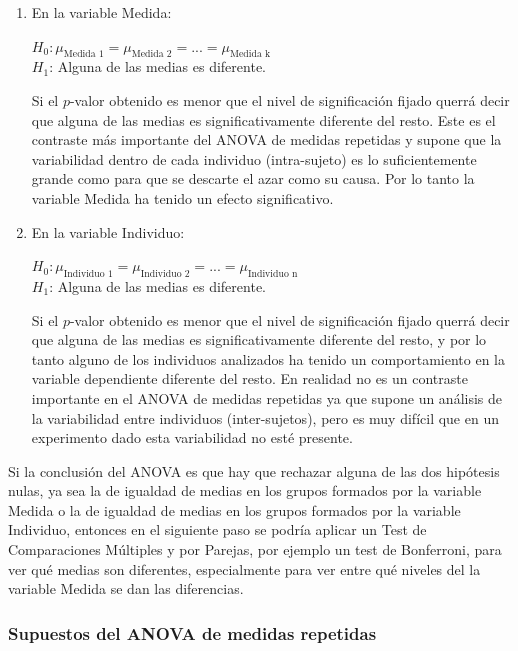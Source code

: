\documentclass[
  spanish,
  a4paper,
]{scrreport}
\theoremstyle{plain}
\theoremstyle{definition}
\theoremstyle{definition}
\theoremstyle{remark}
\begin{document}
\begin{enumerate}
\def\labelenumi{\arabic{enumi}.}
\item
  En la variable Medida:

  \(H_0: \mu_{\text{Medida 1}}=\mu_{\text{Medida 2}}=...=\mu_{\text{Medida k}}\)\\
  \(H_1\): Alguna de las medias es diferente.

  Si el \(p\)-valor obtenido es menor que el nivel de significación
  fijado querrá decir que alguna de las medias es significativamente
  diferente del resto. Este es el contraste más importante del ANOVA de
  medidas repetidas y supone que la variabilidad dentro de cada
  individuo (intra-sujeto) es lo suficientemente grande como para que se
  descarte el azar como su causa. Por lo tanto la variable Medida ha
  tenido un efecto significativo.
\item
  En la variable Individuo:

  \(H_0: \mu_{\text{Individuo 1}}=\mu_{\text{Individuo 2}}=...=\mu_{\text{Individuo n}}\)\\
  \(H_1\): Alguna de las medias es diferente.

  Si el \(p\)-valor obtenido es menor que el nivel de significación
  fijado querrá decir que alguna de las medias es significativamente
  diferente del resto, y por lo tanto alguno de los individuos
  analizados ha tenido un comportamiento en la variable dependiente
  diferente del resto. En realidad no es un contraste importante en el
  ANOVA de medidas repetidas ya que supone un análisis de la
  variabilidad entre individuos (inter-sujetos), pero es muy difícil que
  en un experimento dado esta variabilidad no esté presente.
\end{enumerate}

Si la conclusión del ANOVA es que hay que rechazar alguna de las dos
hipótesis nulas, ya sea la de igualdad de medias en los grupos formados
por la variable Medida o la de igualdad de medias en los grupos formados
por la variable Individuo, entonces en el siguiente paso se podría
aplicar un Test de Comparaciones Múltiples y por Parejas, por ejemplo un
test de Bonferroni, para ver qué medias son diferentes, especialmente
para ver entre qué niveles del la variable Medida se dan las
diferencias.

\subsubsection{Supuestos del ANOVA de medidas
repetidas}\label{supuestos-del-anova-de-medidas-repetidas}
\end{document}
